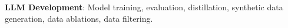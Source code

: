 
\textbf{LLM Development}: Model training, evaluation, distillation, synthetic data generation, data ablations, data filtering.













